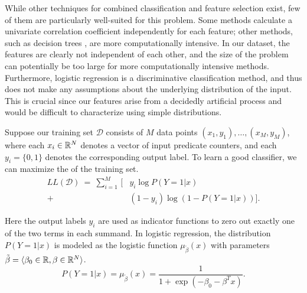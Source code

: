 While other techniques for combined classification and feature
selection exist, few of them are particularly well-suited for this
problem.  Some methods \cite{Golub:MCC:1999,Tibshirani2002} calculate
a univariate correlation coefficient independently for each feature;
other methods, such as decision trees \cite{00000048}, are more
computationally intensive.  In our dataset, the features are clearly
not independent of each other, and the size of the problem can
potentially be too large for more computationally intensive methods.
Furthermore, logistic regression is a discriminative classification
method, and thus does not make any assumptions about the underlying
distribution of the input.  This is crucial since our features arise
from a decidedly artificial process and would be difficult to
characterize using simple distributions.

Suppose our training set $\mathcal{D}$ consists of $M$ data points
$(x_1,y_1), \ldots, (x_M, y_M) $, where each $x_i \in \mathbb{R}^N$ denotes
a vector of input predicate counters, and each $y_i = \{0, 1\}$
denotes the corresponding output label.  To learn a good classifier,
we can maximize the  of the training set.
\begin{equation*}
  \begin{split}
    LL(\mathcal{D}) \:=\:
    \sum_{i=1}^M \, [ & y_i \log P(Y = 1 | x) \\
    + & (1 - y_i) \log (1 - P(Y = 1 | x)) ].
  \end{split}
\end{equation*}

Here the output labels $y_i$ are used as indicator functions to zero
out exactly one of the two terms in each summand.  In logistic
regression, the distribution $P(Y=1|x)$ is modeled as the logistic
function $\mu_{\tilde{\beta}}(x)$ with parameters $\tilde{\beta} = \langle \beta_0 \in
\mathbb{R}, \beta \in \mathbb{R}^N \rangle$.
\begin{equation*}
  P(Y = 1 | x) = \mu_{\tilde{\beta}} (x) = \frac{1}{1 + \exp(- \beta_0 - \beta^T x)}.
\end{equation*}

